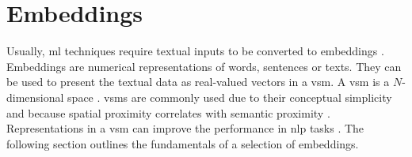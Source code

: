 \section{Embeddings}\label{sec:embeddings}

Usually, \ac{ml} techniques require textual inputs to be converted to embeddings \cite{SentRep2014}.
Embeddings are numerical representations of words, sentences or texts.
They can be used to present the textual data as real-valued vectors in a \ac{vsm}.
A \ac{vsm} is a $N$-dimensional space \cite{soft_cosine2014}.
\acp{vsm} are commonly used due to their conceptual simplicity and because spatial proximity correlates with semantic proximity 
\cite{tfidf2008, UniversalSentEnc2018, HfsentTrans2019, Top2Vec2020}.
Representations in a \ac{vsm} can improve the performance in \ac{nlp} tasks \cite{SkipGram2013}.
The following section outlines the fundamentals of a selection of embeddings.












